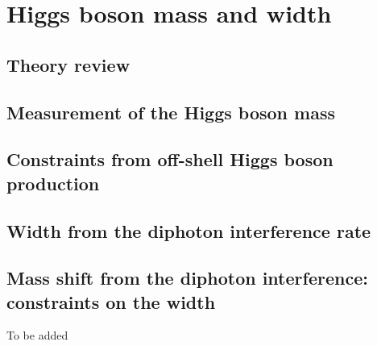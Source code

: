 \documentclass[../report.tex]{subfiles}
\providecommand{\main}{..}
\begin{document}
\section{Higgs boson mass and width}\label{sec5}

\subsection{Theory review}



\subsection{Measurement of the Higgs boson mass}



\subsection{Constraints from off-shell Higgs boson production}

\label{sec:5_offshell}

\subsection{Width from the diphoton interference rate}
\label{sec:5_interference_real}


\subsection{Mass shift from the diphoton interference: constraints on the width}
\label{sec:5_interference_imag}
To be added


%
%
\end{document}
